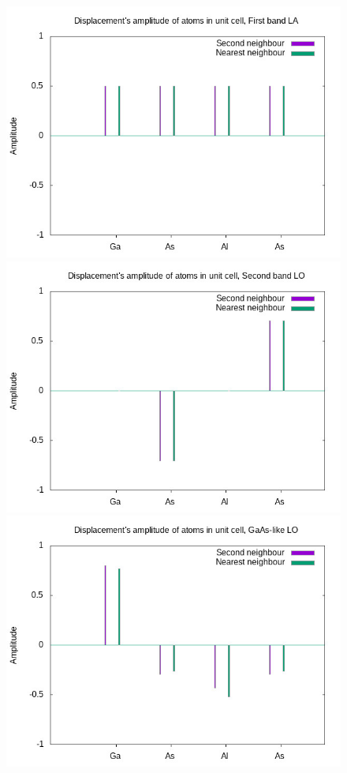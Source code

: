 \documentclass{article}
\begin{document}
\begin{figure}[hp]
	\centering
	\includegraphics[scale=0.35]{ampiezze1.jpg}
	\includegraphics[scale=0.35]{ampiezze2.jpg}
	\includegraphics[scale=0.35]{ampiezze3.jpg}

\end{figure}
\end{document}
